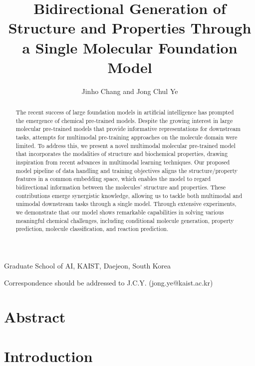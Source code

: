 \documentclass{nature_meth}
\title{Bidirectional Generation of Structure and Properties Through a Single Molecular Foundation Model}
\author{Jinho Chang and Jong Chul Ye
}
\newcommand{\1}{\blmath{1}}
\newcommand{\0}{\blmath{0}}
\begin{document}

\maketitle

\begin{affiliations}
\item Graduate School of AI, KAIST, Daejeon, South Korea
\item[] Correspondence should be addressed to J.C.Y. (jong.ye@kaist.ac.kr)
\end{affiliations}
 
\vspace{-0.5cm}
\section*{Abstract}
\begin{abstract}
The recent success of large foundation models in artificial intelligence has prompted the emergence of chemical pre-trained models. Despite the growing interest in large molecular pre-trained models that provide informative representations for downstream tasks, attempts for multimodal pre-training approaches on the molecule domain were limited. To address this, we present a novel multimodal molecular pre-trained model that incorporates the modalities of structure and biochemical properties, drawing inspiration from recent advances in multimodal learning techniques. Our proposed model pipeline of data handling and training objectives aligns the structure/property features in a common embedding space, which enables the model to regard bidirectional information between the molecules' structure and properties. These contributions emerge synergistic knowledge, allowing us to tackle both multimodal and unimodal downstream tasks through a single model. Through extensive experiments, we demonstrate that our model shows remarkable capabilities in solving various meaningful chemical challenges, including conditional molecule generation, property prediction, molecule classification, and reaction prediction.



\end{abstract}

\clearpage
{}

\section*{Introduction}
\end{document}
